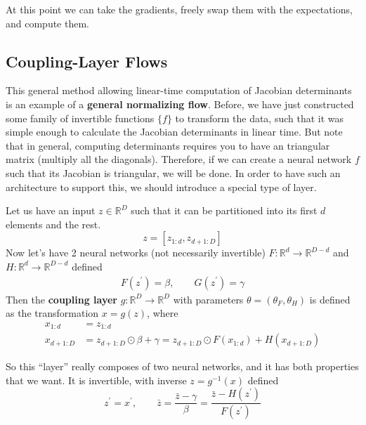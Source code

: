  At this point we can take the gradients, freely swap them with the expectations, and compute them. 

\subsection{Coupling-Layer Flows} 

    This general method allowing linear-time computation of Jacobian determinants is an example of a \textbf{general normalizing flow}. Before, we have just constructed some family of invertible functions $\{f\}$ to transform the data, such that it was simple enough to calculate the Jacobian determinants in linear time. But note that in general, computing determinants requires you to have an triangular matrix (multiply all the diagonals). Therefore, if we can create a neural network $f$ such that its Jacobian is triangular, we will be done. In order to have such an architecture to support this, we should introduce a special type of layer.  

    \begin{definition}
      Let us have an input $z \in \mathbb{R}^D$ such that it can be partitioned into its first $d$ elements and the rest. 
      \begin{equation}
        z = [z_{1:d}, z_{d+1:D}]
      \end{equation}
      Now let's have 2 neural networks (not necessarily invertible) $F: \mathbb{R}^d \rightarrow \mathbb{R}^{D-d}$ and $H: \mathbb{R}^d \rightarrow \mathbb{R}^{D-d}$ defined 
      \begin{align}
        F(z^\prime) = \beta, \qquad G(z^\prime) = \gamma
      \end{align}
      Then the \textbf{coupling layer} $g: \mathbb{R}^D \rightarrow \mathbb{R}^D$ with parameters $\theta = (\theta_F, \theta_H)$ is defined as the transformation $x = g(z)$, where
      \begin{align}
        x_{1:d} & = z_{1:d} \\ 
        x_{d+1:D} & = z_{d+1:D} \odot \beta + \gamma = z_{d+1:D} \odot F(x_{1:d}) + H(x_{d+1:D})
      \end{align}
    \end{definition}

    So this ``layer'' really composes of two neural networks, and it has both properties that we want. It is invertible, with inverse $z = g^{-1} (x)$ defined 
    \begin{equation}
      z^\prime = x^\prime, \qquad \bar{z} = \frac{\bar{z} - \gamma}{\beta} = \frac{\bar{z} - H(z^\prime)}{F(z^\prime)} 
    \end{equation} 

